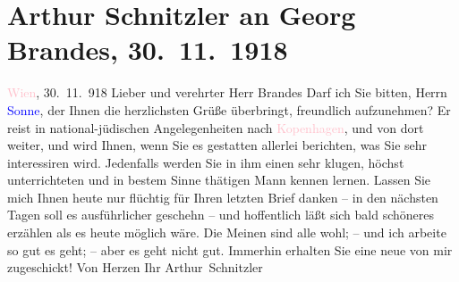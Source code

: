 

               \section[Arthur Schnitzler an Georg Brandes, 30. 11. 1918]{ Arthur Schnitzler an Georg Brandes, 30. 11. 1918}\nopagebreak{}\rehead{ }\normalsize\beginnumbering{} \toendnotes[C]{\smallbreak\pagebreak[2]} 
\toendnotes[C]{\smallbreak}\pstart
           \raggedleft{}{\pb}\textcolor{pink}{Wien}{}\ledrightnote{\textcolor{pink}{Wien}}, 30. 11. 918\pend
           \pstart{}Lieber und verehrter Herr Brandes\pend\pstart
           Darf ich Sie bitten, Herrn \textcolor{blue}{Sonne}{}\ledrightnote{\textcolor{blue}{Abraham Sonne}}, der Ihnen
                    die herzlichsten Grüße überbringt, freundlich aufzunehmen? Er reist in
                    national-jüdischen Angelegenheiten nach \textcolor{pink}{Kopenhagen}{}\ledrightnote{\textcolor{pink}{Kopenhagen}}, und von dort weiter, und wird Ihnen, wenn Sie es gestatten
                    allerlei berichten, was Sie sehr interessiren wird. Jedenfalls werden Sie in ihm
                    einen sehr klugen, höchst unterrichteten und in bestem Sinne thätigen Mann
                    kennen lernen.\pend
           \pstart
           Lassen Sie mich Ihnen heute nur flüchtig für Ihren letzten Brief danken – in den
                    nächsten Tagen soll es ausführlicher geschehn – und hoffentlich läßt sich bald
                    schöneres erzählen als es heute möglich wäre. Die Meinen sind alle wohl; – und
                    ich arbeite so gut es geht; – aber es geht nicht gut. Immerhin erhalten Sie eine
                    neue \label{T_L02312_1v}\label{T_L02312_1h}
                    von mir zugeschickt! Von Herzen\pend
           \pstart Ihr \spacefill\mbox{Arthur Schnitzler}\pend{}\endnumbering{}  
      
